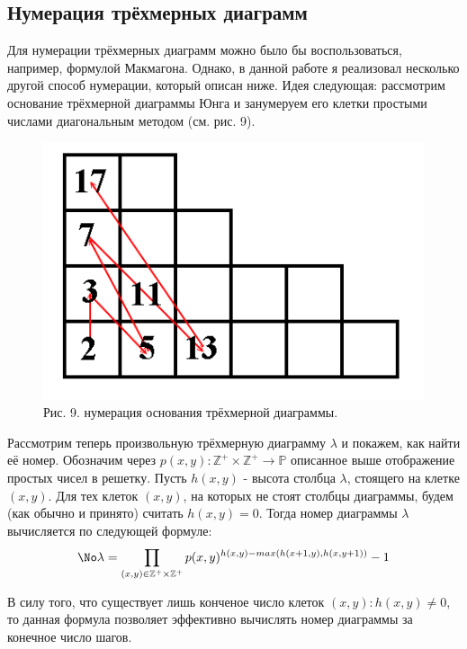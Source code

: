 \documentclass[12pt]{report}
\begin{document}
\newpage
\subsection*{Нумерация трёхмерных диаграмм}
\hspace{\parindent}Для нумерации трёхмерных диаграмм можно было бы воспользоваться, например, формулой Макмагона. Однако, в данной работе я реализовал несколько другой способ нумерации, который описан ниже.
Идея следующая: рассмотрим  основание трёхмерной диаграммы Юнга и занумеруем его клетки простыми числами диагональным методом (см. рис. 9).

\begin{figure}[!ht]
\begin{center}
\includegraphics[scale=0.4]{Count3D}
\\Рис. 9. нумерация основания трёхмерной диаграммы.
\end{center}
\end{figure}

Рассмотрим теперь произвольную трёхмерную диаграмму $\lambda$ и покажем, как найти её номер. Обозначим через $p(x, y) : \mathbb{Z}^+ \times \mathbb{Z}^+ \rightarrow \mathbb{P}$  описанное выше отображение простых чисел в решетку. Пусть $h(x,y)$ - высота столбца $\lambda$, стоящего на клетке $(x,y)$. Для тех клеток $(x,y)$, на которых не стоят столбцы диаграммы, будем (как обычно и принято) считать $h(x,y) = 0$.
Тогда номер диаграммы $\lambda$ вычисляется по следующей формуле:
$$\No\lambda = \prod\limits_{(x,y) \in \mathbb{Z}^+ \times \mathbb{Z}^+}
 p(x,y)^{h(x,y) - max(h(x+1,y), h(x,y+1))} - 1$$

В силу того, что существует лишь конченое число клеток $(x,y) : h(x,y) \neq 0$, то данная формула позволяет эффективно вычислять номер диаграммы за конечное число шагов.
\end{document}
